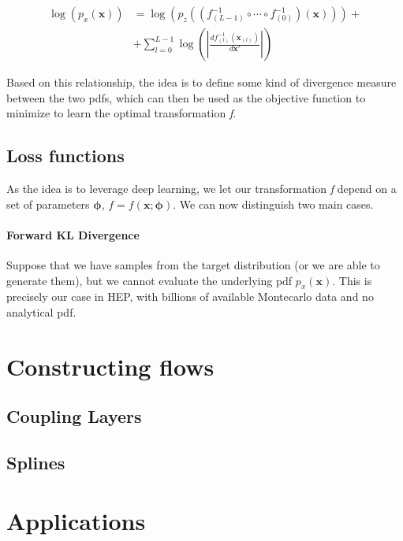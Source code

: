 	\begin{equation*}
		\begin{aligned}
			\log(p_x(\mathbf{x})) &= \log\left(p_z\left(\left(f_{(L-1)}^{-1}\circ\cdots\circ f_{(0)}^{-1}\right)\left(\mathbf{x}\right)\right)\right)+\\
			&+\sum^{L-1}_{l=0}\log\left(\left|\frac{df^{-1}_{(l)}(\mathbf{x}_{(l)})}{d\mathbf{x}'}\right|\right)
		\end{aligned}
	\end{equation*}
	
Based on this relationship, the idea is to define some kind of divergence measure between the two pdfs, which can then be used as the objective function to minimize to learn the optimal transformation \emph{f}.

\subsection{Loss functions}

As the idea is to leverage deep learning, we let our transformation \emph{f} depend on a set of parameters $\pmb{\phi}$, $f = f(\mathbf{x}; \pmb{\phi})$.
We can now distinguish two main cases.

\paragraph{Forward KL Divergence}
Suppose that we have samples from the target distribution (or we are able to generate them), but we cannot evaluate the underlying pdf $p_x(\mathbf{x})$. This is precisely our case in HEP, with billions of available Montecarlo data and no analytical pdf.

\section{Constructing flows}

\subsection{Coupling Layers}

\subsection{Splines}

\section{Applications}

